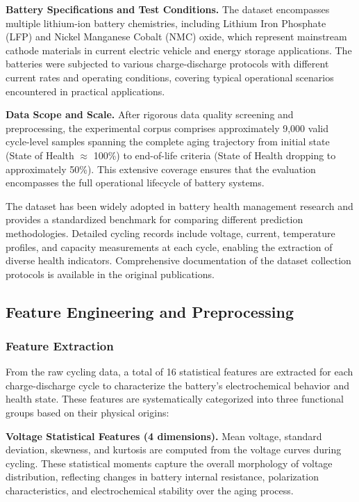 \documentclass[5p,times]{elsarticle}
\begin{document}
\textbf{Battery Specifications and Test Conditions.} The dataset encompasses multiple lithium-ion battery chemistries, including Lithium Iron Phosphate (LFP) and Nickel Manganese Cobalt (NMC) oxide, which represent mainstream cathode materials in current electric vehicle and energy storage applications. The batteries were subjected to various charge-discharge protocols with different current rates and operating conditions, covering typical operational scenarios encountered in practical applications.

\textbf{Data Scope and Scale.} After rigorous data quality screening and preprocessing, the experimental corpus comprises approximately 9,000 valid cycle-level samples spanning the complete aging trajectory from initial state (State of Health $\approx$ 100\%) to end-of-life criteria (State of Health dropping to approximately 50\%). This extensive coverage ensures that the evaluation encompasses the full operational lifecycle of battery systems.

The dataset has been widely adopted in battery health management research and provides a standardized benchmark for comparing different prediction methodologies. Detailed cycling records include voltage, current, temperature profiles, and capacity measurements at each cycle, enabling the extraction of diverse health indicators. Comprehensive documentation of the dataset collection protocols is available in the original publications.

\subsection{Feature Engineering and Preprocessing}\label{sec:features}

\subsubsection{Feature Extraction}

From the raw cycling data, a total of 16 statistical features are extracted for each charge-discharge cycle to characterize the battery's electrochemical behavior and health state. These features are systematically categorized into three functional groups based on their physical origins:

\textbf{Voltage Statistical Features (4 dimensions).} Mean voltage, standard deviation, skewness, and kurtosis are computed from the voltage curves during cycling. These statistical moments capture the overall morphology of voltage distribution, reflecting changes in battery internal resistance, polarization characteristics, and electrochemical stability over the aging process.
\end{document}
